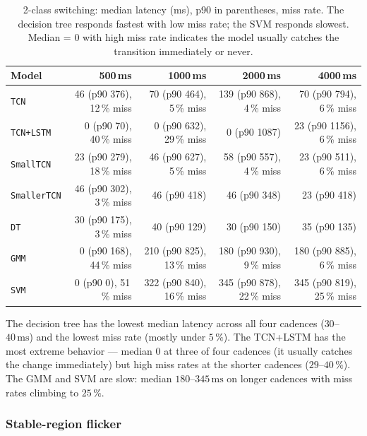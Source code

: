 \begin{table}[h]
\centering
\small
\begin{tabular}{l@{\hskip 6pt}rrrr}
\toprule
\textbf{Model} & \textbf{500\,ms} & \textbf{1000\,ms} & \textbf{2000\,ms} & \textbf{4000\,ms} \\
\midrule
\texttt{TCN}        & 46 (p90 376), 12\,\% miss & 70 (p90 464), 5\,\% miss & 139 (p90 868), 4\,\% miss & 70 (p90 794), 6\,\% miss \\
\texttt{TCN+LSTM}   & 0 (p90 70), 40\,\% miss & 0 (p90 632), 29\,\% miss & 0 (p90 1087) & 23 (p90 1156), 6\,\% miss \\
\texttt{SmallTCN}   & 23 (p90 279), 18\,\% miss & 46 (p90 627), 5\,\% miss & 58 (p90 557), 4\,\% miss & 23 (p90 511), 6\,\% miss \\
\texttt{SmallerTCN} & 46 (p90 302), 3\,\% miss & 46 (p90 418) & 46 (p90 348) & 23 (p90 418) \\
\texttt{DT}         & 30 (p90 175), 3\,\% miss & 40 (p90 129) & 30 (p90 150) & 35 (p90 135) \\
\texttt{GMM}        & 0 (p90 168), 44\,\% miss & 210 (p90 825), 13\,\% miss & 180 (p90 930), 9\,\% miss & 180 (p90 885), 6\,\% miss \\
\texttt{SVM}        & 0 (p90 0), 51\,\% miss & 322 (p90 840), 16\,\% miss & 345 (p90 878), 22\,\% miss & 345 (p90 819), 25\,\% miss \\
\bottomrule
\end{tabular}
\caption{2-class switching: median latency (ms), p90 in parentheses, miss rate. The decision tree responds fastest with low miss rate; the SVM responds slowest. Median = 0 with high miss rate indicates the model usually catches the transition immediately or never.}
\label{tab:transitions_2class_latency}
\end{table}

The decision tree has the lowest median latency across all four cadences ($30$--$40\,\text{ms}$) and the lowest miss rate (mostly under $5\,\%$).
The TCN+LSTM has the most extreme behavior — median $0$ at three of four cadences (it usually catches the change immediately) but high miss rates at the shorter cadences ($29$--$40\,\%$).
The GMM and SVM are slow: median $180$--$345\,\text{ms}$ on longer cadences with miss rates climbing to $25\,\%$.

\subsubsection*{Stable-region flicker}

